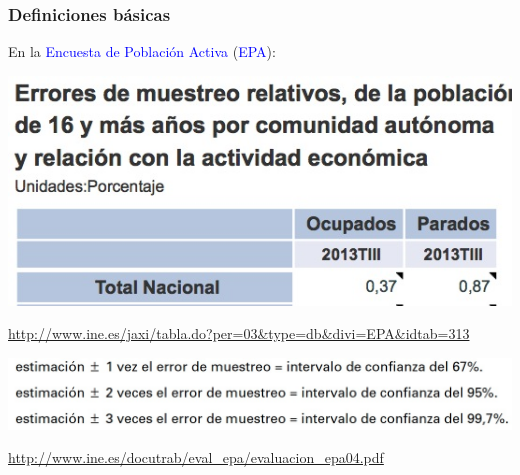 \documentclass[12pt,t]{beamer}
\newcommand{\blue}[1]{\textcolor{blue}{#1}}
\theoremstyle{plain}
\theoremstyle{definition}
\begin{document}
\begin{frame}
\frametitle{Definiciones básicas}

En la \blue{Encuesta de Población Activa} (\blue{EPA}):

\begin{center}
\includegraphics[width=0.6\linewidth]{EPA1}

{\scriptsize \url{http://www.ine.es/jaxi/tabla.do?per=03&type=db&divi=EPA&idtab=313}}
\medskip

\includegraphics[width=\linewidth]{EPA2}


{\scriptsize \url{http://www.ine.es/docutrab/eval_epa/evaluacion_epa04.pdf}}
\end{center}
\end{frame}
\end{document}
